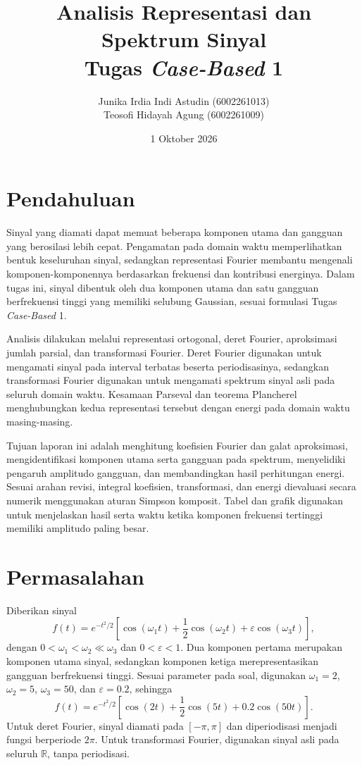 \documentclass[11pt,a4paper]{article}
\title{\Huge {Analisis Representasi dan Spektrum Sinyal}\\
\Large{Tugas \textit{Case-Based} 1}}
\author{\Large{Junika Irdia Indi Astudin (6002261013)}\\
\Large{Teosofi Hidayah Agung (6002261009)}
}
\date{1 Oktober 2026}
\begin{document}
\maketitle

\section{Pendahuluan}
Sinyal yang diamati dapat memuat beberapa komponen utama dan gangguan
yang berosilasi lebih cepat. Pengamatan pada domain waktu memperlihatkan
bentuk keseluruhan sinyal, sedangkan representasi Fourier membantu
mengenali komponen-komponennya berdasarkan frekuensi dan kontribusi
energinya.
Dalam tugas ini, sinyal dibentuk oleh dua komponen utama
dan satu gangguan berfrekuensi tinggi yang memiliki selubung Gaussian,
sesuai formulasi Tugas \textit{Case-Based} 1.

Analisis dilakukan melalui representasi ortogonal, deret Fourier,
aproksimasi jumlah parsial, dan transformasi Fourier. Deret Fourier
digunakan untuk mengamati sinyal pada interval terbatas beserta
periodisasinya, sedangkan transformasi Fourier digunakan untuk
mengamati spektrum sinyal asli pada seluruh domain waktu.
Kesamaan Parseval dan teorema Plancherel menghubungkan kedua
representasi tersebut dengan energi pada domain waktu masing-masing.

Tujuan laporan ini adalah menghitung koefisien Fourier dan galat
aproksimasi, mengidentifikasi komponen utama serta gangguan pada
spektrum, menyelidiki pengaruh amplitudo gangguan, dan membandingkan
hasil perhitungan energi. Sesuai arahan revisi, integral koefisien,
transformasi, dan energi dievaluasi secara numerik menggunakan
aturan Simpson komposit. Tabel dan grafik digunakan untuk
menjelaskan hasil serta waktu ketika komponen frekuensi tertinggi
memiliki amplitudo paling besar.

\section{Permasalahan}
Diberikan sinyal
\[
 f(t)=e^{-t^2/2}\left[\cos(\omega_1t)+\frac12\cos(\omega_2t)
 +\varepsilon\cos(\omega_3t)\right],
\]
dengan $0<\omega_1<\omega_2\ll\omega_3$ dan $0<\varepsilon<1$.
Dua komponen pertama merupakan komponen utama sinyal, sedangkan komponen
ketiga merepresentasikan gangguan berfrekuensi tinggi. Sesuai parameter
pada soal, digunakan $\omega_1=2$, $\omega_2=5$, $\omega_3=50$, dan
$\varepsilon=0.2$, sehingga
\begin{equation}
 f(t)=e^{-t^2/2}\left[\cos(2t)+\frac12\cos(5t)+0.2\cos(50t)\right].
 \label{eq:sinyal}
\end{equation}
Untuk deret Fourier, sinyal diamati pada $[-\pi,\pi]$ dan diperiodisasi
menjadi fungsi berperiode $2\pi$. Untuk transformasi Fourier, digunakan
sinyal asli pada seluruh $\mathbb R$, tanpa periodisasi.
\end{document}
